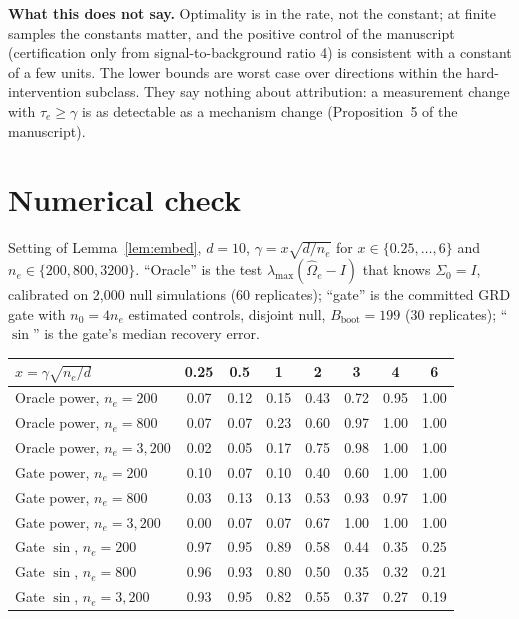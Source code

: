 \documentclass[11pt]{article}
\newcommand{\Bb}{B_{\mathrm{boot}}}
\begin{document}
\noindent\textbf{What this does not say.} Optimality is in the rate, not the constant; at finite samples the constants matter, and the positive control of the manuscript (certification only from signal-to-background ratio 4) is consistent with a constant of a few units. The lower bounds are worst case over directions within the hard-intervention subclass. They say nothing about attribution: a measurement change with $\tau_e\ge\gamma$ is as detectable as a mechanism change (Proposition~5 of the manuscript).

\section{Numerical check}

Setting of Lemma~\ref{lem:embed}, $d=10$, $\gamma=x\sqrt{d/n_e}$ for $x\in\{0.25,\ldots,6\}$ and $n_e\in\{200,800,3200\}$. ``Oracle'' is the test $\lambda_{\max}(\widehat\Omega_e-I)$ that knows $\Sigma_0=I$, calibrated on 2{,}000 null simulations (60 replicates); ``gate'' is the committed GRD gate with $n_0=4n_e$ estimated controls, disjoint null, $\Bb=199$ (30 replicates); ``$\sin$'' is the gate's median recovery error.

\begin{center}
\small
\begin{tabular}{lccccccc}
\toprule
$x=\gamma\sqrt{n_e/d}$ & 0.25 & 0.5 & 1 & 2 & 3 & 4 & 6 \\
\midrule
Oracle power, $n_e=200$ & 0.07 & 0.12 & 0.15 & 0.43 & 0.72 & 0.95 & 1.00 \\
Oracle power, $n_e=800$ & 0.07 & 0.07 & 0.23 & 0.60 & 0.97 & 1.00 & 1.00 \\
Oracle power, $n_e=3{,}200$ & 0.02 & 0.05 & 0.17 & 0.75 & 0.98 & 1.00 & 1.00 \\
\addlinespace
Gate power, $n_e=200$ & 0.10 & 0.07 & 0.10 & 0.40 & 0.60 & 1.00 & 1.00 \\
Gate power, $n_e=800$ & 0.03 & 0.13 & 0.13 & 0.53 & 0.93 & 0.97 & 1.00 \\
Gate power, $n_e=3{,}200$ & 0.00 & 0.07 & 0.07 & 0.67 & 1.00 & 1.00 & 1.00 \\
\addlinespace
Gate $\sin$, $n_e=200$ & 0.97 & 0.95 & 0.89 & 0.58 & 0.44 & 0.35 & 0.25 \\
Gate $\sin$, $n_e=800$ & 0.96 & 0.93 & 0.80 & 0.50 & 0.35 & 0.32 & 0.21 \\
Gate $\sin$, $n_e=3{,}200$ & 0.93 & 0.95 & 0.82 & 0.55 & 0.37 & 0.27 & 0.19 \\
\bottomrule
\end{tabular}
\end{center}
\end{document}

